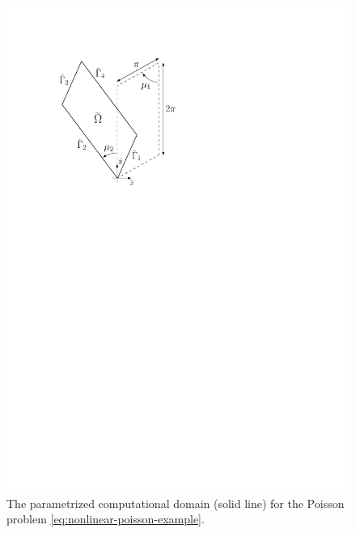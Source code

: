 \documentclass[12pt, a4paper, twoside, openright, notitlepage]{report}
\numberwithin{equation}{chapter}
\theoremstyle{theorem}
\theoremstyle{definition}
\theoremstyle{remark}
\theoremstyle{proposition}
\numberwithin{figure}{chapter}
\begin{document}
		\begin{figure}[H]
			\center
			\includegraphics[scale = 0.65]{domain_square}
			
			\caption{The parametrized computational domain (solid line) for the Poisson problem \eqref{eq:nonlinear-poisson-example}.}
			\label{fig:nonlinear-poisson-example-domain}
		\end{figure}
		
		
\end{document}
